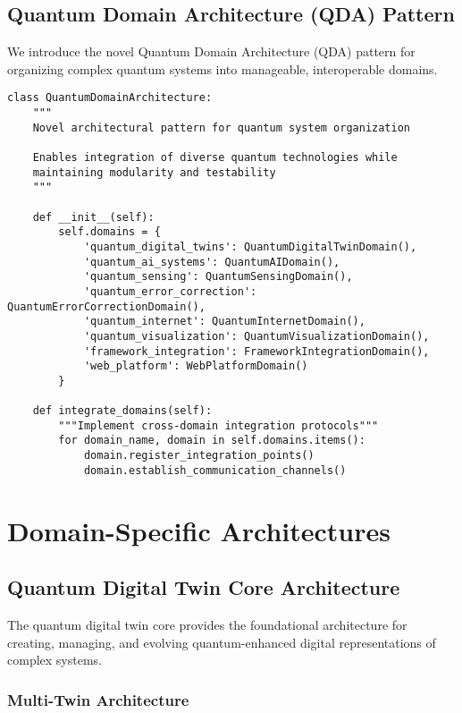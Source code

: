 \documentclass[12pt,a4paper]{report}
\begin{document}
\subsection{Quantum Domain Architecture (QDA) Pattern}

We introduce the novel Quantum Domain Architecture (QDA) pattern for organizing complex quantum systems into manageable, interoperable domains.

\begin{lstlisting}
class QuantumDomainArchitecture:
    """
    Novel architectural pattern for quantum system organization

    Enables integration of diverse quantum technologies while
    maintaining modularity and testability
    """

    def __init__(self):
        self.domains = {
            'quantum_digital_twins': QuantumDigitalTwinDomain(),
            'quantum_ai_systems': QuantumAIDomain(),
            'quantum_sensing': QuantumSensingDomain(),
            'quantum_error_correction': QuantumErrorCorrectionDomain(),
            'quantum_internet': QuantumInternetDomain(),
            'quantum_visualization': QuantumVisualizationDomain(),
            'framework_integration': FrameworkIntegrationDomain(),
            'web_platform': WebPlatformDomain()
        }

    def integrate_domains(self):
        """Implement cross-domain integration protocols"""
        for domain_name, domain in self.domains.items():
            domain.register_integration_points()
            domain.establish_communication_channels()
\end{lstlisting}

\section{Domain-Specific Architectures}

\subsection{Quantum Digital Twin Core Architecture}

The quantum digital twin core provides the foundational architecture for creating, managing, and evolving quantum-enhanced digital representations of complex systems.

\subsubsection{Multi-Twin Architecture}
\end{document}
